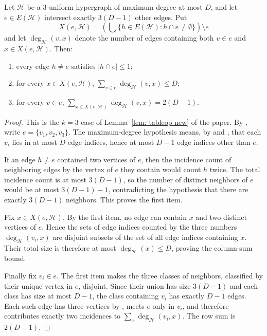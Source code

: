 \begin{lemma}
Let $\mathcal H$ be a $3$-uniform hypergraph of maximum degree at most $D$,
and let $e\in E(\mathcal H)$ intersect exactly $3(D-1)$ other edges.  Put
\[
X(e,\mathcal H)=
\left(\bigcup\{h\in E(\mathcal H):h\cap e\ne\emptyset\}\right)\setminus e
\]
and let $\deg_{\mathcal H}(v,x)$ denote the number of edges containing both
$v\in e$ and $x\in X(e,\mathcal H)$.  Then:
\begin{enumerate}
\item every edge $h\ne e$ satisfies $|h\cap e|\le1$;
\item for every $x\in X(e,\mathcal H)$,
$\sum_{v\in e}\deg_{\mathcal H}(v,x)\le D$;
\item for every $v\in e$,
$\sum_{x\in X(e,\mathcal H)}\deg_{\mathcal H}(v,x)=2(D-1)$.
\end{enumerate}
\end{lemma}
\begin{proof}
This is the $k=3$ case of Lemma~\ref{lem: tableop new} of the paper.  By
, write $e=\{v_1,v_2,v_3\}$.  The maximum-degree
hypothesis means, by  and
, that each $v_i$ lies in at most $D$ edge indices,
hence at most $D-1$ edge indices other than $e$.

If an edge $h\ne e$ contained two vertices of $e$, then the incidence count
of neighboring edges by the vertex of $e$ they contain would count $h$ twice.
The total incidence count is at most $3(D-1)$, so the number of distinct
neighbors of $e$ would be at most $3(D-1)-1$, contradicting the hypothesis
that there are exactly $3(D-1)$ neighbors.  This proves the first item.

Fix $x\in X(e,\mathcal H)$.  By the first item, no edge can contain $x$ and
two distinct vertices of $e$.  Hence the sets of edge indices counted by the
three numbers $\deg_{\mathcal H}(v_i,x)$ are disjoint subsets of the set of
all edge indices containing $x$.  Their total size is therefore at most
$\deg_{\mathcal H}(x)\le D$, proving the column-sum bound.

Finally fix $v_i\in e$.  The first item makes the three classes of neighbors,
classified by their unique vertex in $e$, disjoint.  Since their union has
size $3(D-1)$ and each class has size at most $D-1$, the class containing
$v_i$ has exactly $D-1$ edges.  Each such edge has three vertices by
, meets $e$ only in $v_i$, and therefore
contributes exactly two incidences to
$\sum_x\deg_{\mathcal H}(v_i,x)$.  The row sum is $2(D-1)$.
\end{proof}
